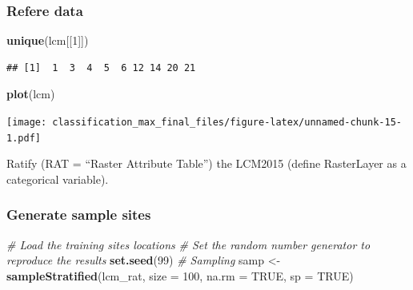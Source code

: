 \documentclass[]{article}
\newenvironment{Shaded}{\begin{snugshade}}{\end{snugshade}}
\newcommand{\CommentTok}[1]{\textcolor[rgb]{0.56,0.35,0.01}{\textit{#1}}}
\newcommand{\DataTypeTok}[1]{\textcolor[rgb]{0.13,0.29,0.53}{#1}}
\newcommand{\DecValTok}[1]{\textcolor[rgb]{0.00,0.00,0.81}{#1}}
\newcommand{\KeywordTok}[1]{\textcolor[rgb]{0.13,0.29,0.53}{\textbf{#1}}}
\newcommand{\NormalTok}[1]{#1}
\newcommand{\OperatorTok}[1]{\textcolor[rgb]{0.81,0.36,0.00}{\textbf{#1}}}
\newcommand{\OtherTok}[1]{\textcolor[rgb]{0.56,0.35,0.01}{#1}}
\newcommand{\StringTok}[1]{\textcolor[rgb]{0.31,0.60,0.02}{#1}}
\begin{document}
\hypertarget{refere-data}{%
\subsubsection{Refere data}\label{refere-data}}

\begin{Shaded}
\begin{Highlighting}[]
\KeywordTok{unique}\NormalTok{(lcm[[}\DecValTok{1}\NormalTok{]])}
\end{Highlighting}
\end{Shaded}

\begin{verbatim}
## [1]  1  3  4  5  6 12 14 20 21
\end{verbatim}

\begin{Shaded}
\begin{Highlighting}[]
\KeywordTok{plot}\NormalTok{(lcm)}
\end{Highlighting}
\end{Shaded}

\texttt{[image: classification\_max\_final\_files/figure-latex/unnamed-chunk-15-1.pdf]}

Ratify (RAT = ``Raster Attribute Table'') the LCM2015 (define
RasterLayer as a categorical variable).

\begin{Shaded}
\end{Shaded}

\hypertarget{generate-sample-sites}{%
\subsubsection{Generate sample sites}\label{generate-sample-sites}}

\begin{Shaded}
\begin{Highlighting}[]
\CommentTok{# Load the training sites locations}
\CommentTok{# Set the random number generator to reproduce the results}
\KeywordTok{set.seed}\NormalTok{(}\DecValTok{99}\NormalTok{)}
\CommentTok{# Sampling}
\NormalTok{samp <-}\StringTok{ }\KeywordTok{sampleStratified}\NormalTok{(lcm_rat, }\DataTypeTok{size =} \DecValTok{100}\NormalTok{, }\DataTypeTok{na.rm =} \OtherTok{TRUE}\NormalTok{, }\DataTypeTok{sp =} \OtherTok{TRUE}\NormalTok{)}
\end{Highlighting}
\end{Shaded}
\end{document}
